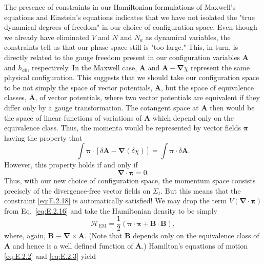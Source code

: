The presence of constraints in our Hamiltonian formulations of Maxwell's equations
and Einstein's equations indicates that we have not isolated the "true dynamical
degrees of freedom" in our choice of configuration space. Even though we already
have eliminated \(V\) and \(N\) and \(N_a\) as dynamical variables, the constraints
tell us that our phase space still is "too large." This, in turn, is directly related
to the gauge freedom present in our configuration variables \(\mathbf{A}\) and
\(h_{ab}\), respectively. In the Maxwell case, \(\mathbf{A}\) and
\(\mathbf{A}-\boldsymbol{\nabla}\chi\) represent the same physical configuration. This suggests
that we should take our configuration space to be not simply the space of vector
potentials, \(\mathbf{A}\), but the space of equivalence classes, \(\overline{\mathbf{A}}\),
of vector potentials, where two vector potentials are equivalent if they differ only
by a gauge transformation. The cotangent space at \(\overline{\mathbf{A}}\) then would
be the space of linear functions of variations of \(\mathbf{A}\) which depend only on
the equivalence class. Thus, the momenta would be represented by vector fields
\(\boldsymbol{\pi}\) having the property that
\begin{equation}
  \int\boldsymbol{\pi}\cdot[\delta\mathbf{A}-\boldsymbol{\nabla}(\delta\chi)]
    =\int\boldsymbol{\pi}\cdot\delta\mathbf{A}.
  \tag{E.2.37}\label{eq:E.2.37}
\end{equation}
However, this property holds if and only if
\begin{equation}
  \boldsymbol{\nabla}\cdot\boldsymbol{\pi}=0.
  \tag{E.2.38}\label{eq:E.2.38}
\end{equation}
Thus, with our new choice of configuration space, the momentum space consists
precisely of the divergence-free vector fields on \(\Sigma_t\). But this means that
the constraint \eqref{eq:E.2.18} is automatically satisfied! We may drop the term
\(V(\boldsymbol{\nabla}\cdot\boldsymbol{\pi})\) from Eq.~\eqref{eq:E.2.16} and take the Hamiltonian
density to be simply
\begin{equation}
  \mathcal H_{\mathrm{EM}}
    =\frac{1}{2}(\boldsymbol{\pi}\cdot\boldsymbol{\pi}+\mathbf{B}\cdot\mathbf{B}),
  \tag{E.2.39}\label{eq:E.2.39}
\end{equation}
where, again, \(\mathbf{B}\equiv\boldsymbol{\nabla}\times\mathbf{A}\). (Note that \(\mathbf{B}\)
depends only on the equivalence class of \(\mathbf{A}\) and hence is a well defined
function of \(\overline{\mathbf{A}}\).) Hamilton's equations of motion
\eqref{eq:E.2.2} and \eqref{eq:E.2.3} yield
